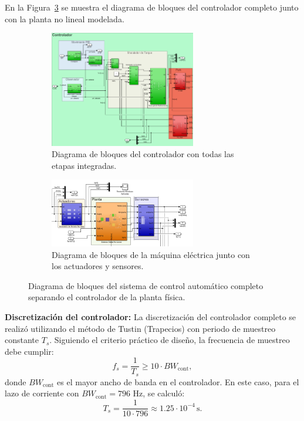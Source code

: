 \documentclass{article}
\begin{document}
En la Figura~\ref{fig:Controlador_Completo} se muestra el diagrama de bloques del controlador completo junto con la planta no lineal modelada.

\begin{figure}[H]
    \centering
    \begin{subfigure}[t]{\textwidth}
        \centering
        \includegraphics[width=0.7\textwidth]{Imagenes/Controlador_Final.png}
        \caption{Diagrama de bloques del controlador con todas las etapas integradas.}
        \label{fig:Controlador_Final}
    \end{subfigure}
    
    \begin{subfigure}[t]{\textwidth}
        \centering
        \includegraphics[width=0.7\textwidth]{Imagenes/Planta_Actuadores_Sensores_Final.png}
        \caption{Diagrama de bloques de la máquina eléctrica junto con los actuadores y sensores.}
        \label{fig:Planta_Actuadores_Sensores_Final}
    \end{subfigure}
    \caption{Diagrama de bloques del sistema de control automático completo separando el controlador de la planta física.}
    \label{fig:Controlador_Completo}
\end{figure}

\textbf{Discretización del controlador:}
La discretización del controlador completo se realizó utilizando el método de Tustin (Trapecios) con periodo de muestreo constante $T_s$. Siguiendo el criterio práctico de diseño, la frecuencia de muestreo debe cumplir:
\[
f_s = \frac{1}{T_s} \geq 10 \cdot BW_\text{cont},
\]
donde $BW_\text{cont}$ es el mayor ancho de banda en el controlador. En este caso, para el lazo de corriente con $BW_\text{cont} = 796$ Hz, se calculó:
\[
T_s = \frac{1}{10 \cdot 796} \approx 1.25 \cdot 10^{-4} \, \text{s}.
\]
\end{document}
